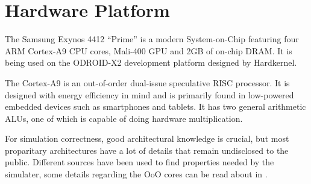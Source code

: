 \section{Hardware Platform}

The Samsung Exynos 4412 ``Prime'' is a modern System-on-Chip featuring four ARM
Cortex-A9 CPU cores, Mali-400 GPU and 2GB of on-chip DRAM. It is being used on
the ODROID-X2 development platform designed by Hardkernel.

The Cortex-A9 is an out-of-order dual-issue speculative RISC processor. It is
designed with energy efficiency in mind and is primarily found in low-powered
embedded devices such as smartphones and tablets. It has two general arithmetic
ALUs, one of which is capable of doing hardware multiplication.

For simulation correctness, good architectural knowledge is crucial, but most
proparitary architectures have a lot of details that remain undisclosed to the
public. Different sources have been used to find properties needed by the simulater,
some details regarding the OoO cores can be read about in \cite{blem2013detailed}.
